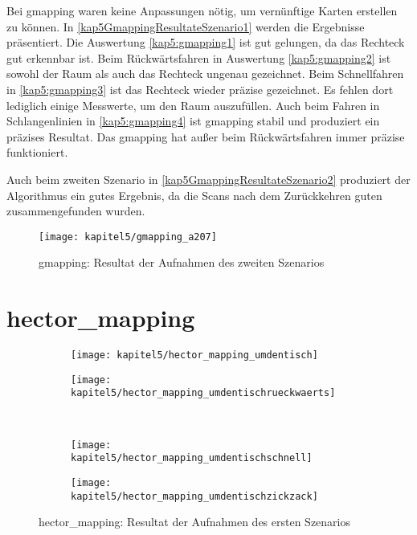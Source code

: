 Bei gmapping waren keine Anpassungen nötig, um vernünftige Karten erstellen zu können. In \autoref{kap5GmappingResultateSzenario1} werden die Ergebnisse präsentiert. Die Auswertung \autoref{kap5:gmapping1} ist gut gelungen, da das Rechteck gut erkennbar ist. Beim Rückwärtsfahren in Auswertung \autoref{kap5:gmapping2} ist sowohl der Raum als auch das Rechteck ungenau gezeichnet. Beim Schnellfahren in \autoref{kap5:gmapping3} ist das Rechteck wieder präzise gezeichnet. Es fehlen dort lediglich einige Messwerte, um den Raum auszufüllen. Auch beim Fahren in Schlangenlinien in \autoref{kap5:gmapping4} ist gmapping stabil und produziert ein präzises Resultat. Das gmapping hat außer beim Rückwärtsfahren immer präzise funktioniert.

Auch beim zweiten Szenario in \autoref{kap5GmappingResultateSzenario2} produziert der Algorithmus ein gutes Ergebnis, da die Scans nach dem Zurückkehren guten zusammengefunden wurden.

\begin{figure}[b]
  \centering
  \texttt{[image: kapitel5/gmapping\_a207]}
  \caption{gmapping: Resultat der Aufnahmen des zweiten Szenarios}
  \label{kap5GmappingResultateSzenario2}
\end{figure}

\section{hector\_mapping}

\begin{figure}[b]
  \centering
  \begin{subfigure}[b]{0.4\linewidth}
    \centering
    \texttt{[image: kapitel5/hector\_mapping\_umdentisch]}
    \label{kap5:hector_mapping1}
  \end{subfigure}%
  \qquad
  \begin{subfigure}[b]{.4\linewidth}
    \centering
    \texttt{[image: kapitel5/hector\_mapping\_umdentischrueckwaerts]}
    \label{kap5:hector_mapping2}
  \end{subfigure}\\
  \vspace{2\floatsep}
  \begin{subfigure}[b]{.4\linewidth}
    \centering
    \texttt{[image: kapitel5/hector\_mapping\_umdentischschnell]}
    \label{kap5:hector_mapping3}
  \end{subfigure}%
    \qquad
  \begin{subfigure}[b]{.4\linewidth}
    \centering
    \texttt{[image: kapitel5/hector\_mapping\_umdentischzickzack]}
    \label{kap5:hector_mapping4}
  \end{subfigure}%
  \qquad
  \caption{hector\_mapping: Resultat der Aufnahmen des ersten Szenarios}
  \label{kap5HectorMappingResultateSzenario1}
\end{figure}

